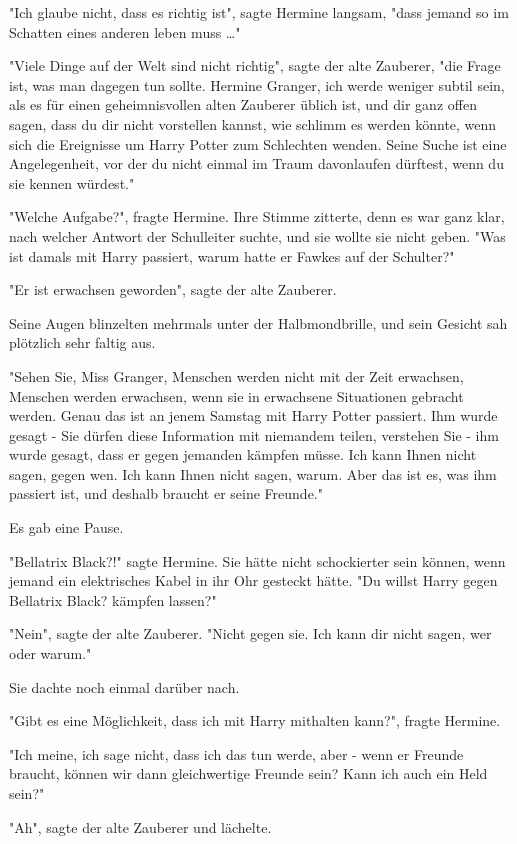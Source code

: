 {"Ich glaube nicht, dass es richtig ist", sagte Hermine langsam, "dass jemand so im Schatten eines anderen leben muss …"

"Viele Dinge auf der Welt sind nicht richtig", sagte der alte Zauberer, "die Frage ist, was man dagegen tun sollte. Hermine Granger, ich werde weniger subtil sein, als es für einen geheimnisvollen alten Zauberer üblich ist, und dir ganz offen sagen, dass du dir nicht vorstellen kannst, wie schlimm es werden könnte, wenn sich die Ereignisse um Harry Potter zum Schlechten wenden. Seine Suche ist eine Angelegenheit, vor der du nicht einmal im Traum davonlaufen dürftest, wenn du sie kennen würdest."

"Welche Aufgabe?", fragte Hermine. Ihre Stimme zitterte, denn es war ganz klar, nach welcher Antwort der Schulleiter suchte, und sie wollte sie nicht geben. "Was ist damals mit Harry passiert, warum hatte er Fawkes auf der Schulter?"

"Er ist erwachsen geworden", sagte der alte Zauberer.

Seine Augen blinzelten mehrmals unter der Halbmondbrille, und sein Gesicht sah plötzlich sehr faltig aus.

"Sehen Sie, Miss Granger, Menschen werden nicht mit der Zeit erwachsen, Menschen werden erwachsen, wenn sie in erwachsene Situationen gebracht werden. Genau das ist an jenem Samstag mit Harry Potter passiert. Ihm wurde gesagt - Sie dürfen diese Information mit niemandem teilen, verstehen Sie - ihm wurde gesagt, dass er gegen jemanden kämpfen müsse. Ich kann Ihnen nicht sagen, gegen wen. Ich kann Ihnen nicht sagen, warum. Aber das ist es, was ihm passiert ist, und deshalb braucht er seine Freunde."

Es gab eine Pause.

"Bellatrix Black?!" sagte Hermine. Sie hätte nicht schockierter sein können, wenn jemand ein elektrisches Kabel in ihr Ohr gesteckt hätte. "Du willst Harry gegen Bellatrix Black? kämpfen lassen?"

"Nein", sagte der alte Zauberer. "Nicht gegen sie. Ich kann dir nicht sagen, wer oder warum."

Sie dachte noch einmal darüber nach.

"Gibt es eine Möglichkeit, dass ich mit Harry mithalten kann?", fragte Hermine.

"Ich meine, ich sage nicht, dass ich das tun werde, aber - wenn er Freunde braucht, können wir dann gleichwertige Freunde sein? Kann ich auch ein Held sein?"

"Ah", sagte der alte Zauberer und lächelte.

}
